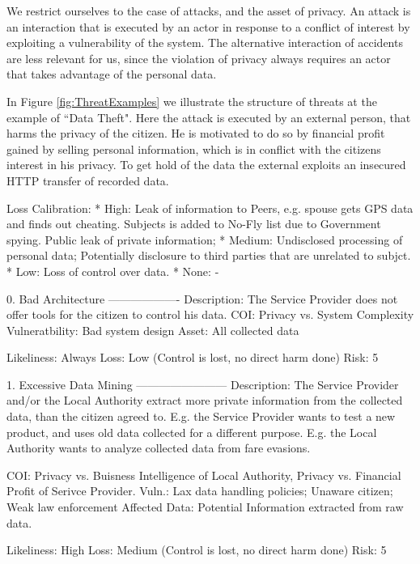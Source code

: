 We restrict ourselves to the case of attacks, and the asset of privacy.
An attack is an interaction that is executed by an actor in response to a conflict of interest by exploiting a vulnerability of the system.
The alternative interaction of accidents are less relevant for us, since the violation of privacy always requires an actor that takes advantage of the personal data.

In Figure \ref{fig:ThreatExamples} we illustrate the structure of threats at the example of ``Data Theft".
Here the attack is executed by an external person, that harms the privacy of the citizen.
He is motivated to do so by financial profit gained by selling personal information, which
is in conflict with the citizens interest in his privacy.
To get hold of the data the external exploits an insecured HTTP transfer of recorded data.


Loss Calibration:
* High:   Leak of information to Peers, e.g. spouse gets GPS data and finds out cheating.
          Subjects is added to No-Fly list due to Government spying.
          Public leak of private information;
* Medium: Undisclosed processing of personal data;
          Potentially disclosure to third parties that are unrelated to subjct.
* Low:    Loss of control over data.
* None: -

0. Bad Architecture
-------------------
Description:    The Service Provider does not offer tools for the citizen to control his data.
COI:            Privacy vs. System Complexity
Vulneratbility: Bad system design
Asset:          All collected data

Likeliness: Always
Loss: Low (Control is lost, no direct harm done)
Risk:      5

1. Excessive Data Mining
------------------------
Description: The Service Provider and/or the Local Authority extract more private information from the collected data, than the citizen agreed to.
E.g. the Service Provider wants to test a new product, and uses old data collected for a different purpose.
E.g. the Local Authority wants to analyze collected data from fare evasions.

COI: Privacy vs. Buisness Intelligence of Local Authority, Privacy vs. Financial Profit of Serivce Provider.
Vuln.: Lax data handling policies; Unaware citizen; Weak law enforcement
Affected Data: Potential Information extracted from raw data.

Likeliness: High
Loss:      Medium (Control is lost, no direct harm done)
Risk:      5

